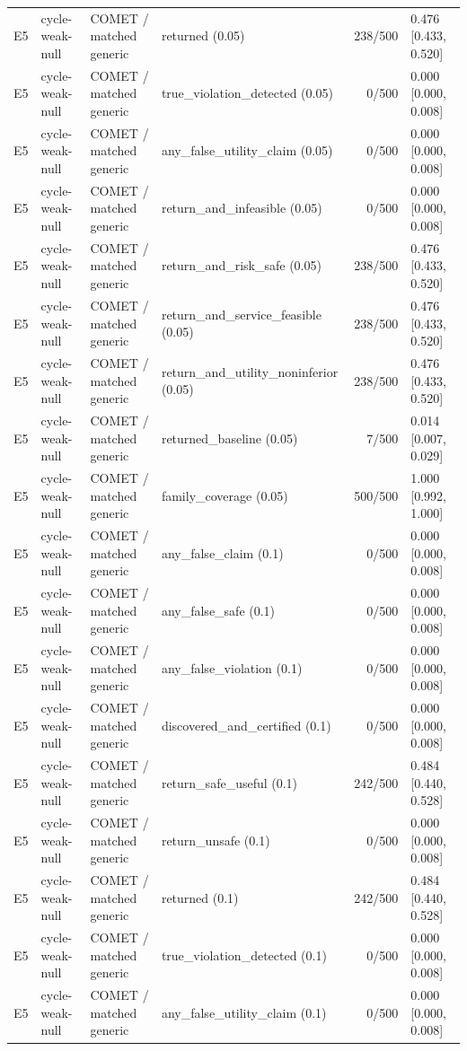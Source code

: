 \begin{longtable}{p{.04\linewidth}p{.18\linewidth}p{.19\linewidth}p{.16\linewidth}r p{.21\linewidth}}
E5 & cycle-weak-null & COMET / matched generic & returned (0.05) & 238/500 & 0.476 [0.433, 0.520]\\
E5 & cycle-weak-null & COMET / matched generic & true\_violation\_detected (0.05) & 0/500 & 0.000 [0.000, 0.008]\\
E5 & cycle-weak-null & COMET / matched generic & any\_false\_utility\_claim (0.05) & 0/500 & 0.000 [0.000, 0.008]\\
E5 & cycle-weak-null & COMET / matched generic & return\_and\_infeasible (0.05) & 0/500 & 0.000 [0.000, 0.008]\\
E5 & cycle-weak-null & COMET / matched generic & return\_and\_risk\_safe (0.05) & 238/500 & 0.476 [0.433, 0.520]\\
E5 & cycle-weak-null & COMET / matched generic & return\_and\_service\_feasible (0.05) & 238/500 & 0.476 [0.433, 0.520]\\
E5 & cycle-weak-null & COMET / matched generic & return\_and\_utility\_noninferior (0.05) & 238/500 & 0.476 [0.433, 0.520]\\
E5 & cycle-weak-null & COMET / matched generic & returned\_baseline (0.05) & 7/500 & 0.014 [0.007, 0.029]\\
E5 & cycle-weak-null & COMET / matched generic & family\_coverage (0.05) & 500/500 & 1.000 [0.992, 1.000]\\
E5 & cycle-weak-null & COMET / matched generic & any\_false\_claim (0.1) & 0/500 & 0.000 [0.000, 0.008]\\
E5 & cycle-weak-null & COMET / matched generic & any\_false\_safe (0.1) & 0/500 & 0.000 [0.000, 0.008]\\
E5 & cycle-weak-null & COMET / matched generic & any\_false\_violation (0.1) & 0/500 & 0.000 [0.000, 0.008]\\
E5 & cycle-weak-null & COMET / matched generic & discovered\_and\_certified (0.1) & 0/500 & 0.000 [0.000, 0.008]\\
E5 & cycle-weak-null & COMET / matched generic & return\_safe\_useful (0.1) & 242/500 & 0.484 [0.440, 0.528]\\
E5 & cycle-weak-null & COMET / matched generic & return\_unsafe (0.1) & 0/500 & 0.000 [0.000, 0.008]\\
E5 & cycle-weak-null & COMET / matched generic & returned (0.1) & 242/500 & 0.484 [0.440, 0.528]\\
E5 & cycle-weak-null & COMET / matched generic & true\_violation\_detected (0.1) & 0/500 & 0.000 [0.000, 0.008]\\
E5 & cycle-weak-null & COMET / matched generic & any\_false\_utility\_claim (0.1) & 0/500 & 0.000 [0.000, 0.008]\\

\end{longtable}
